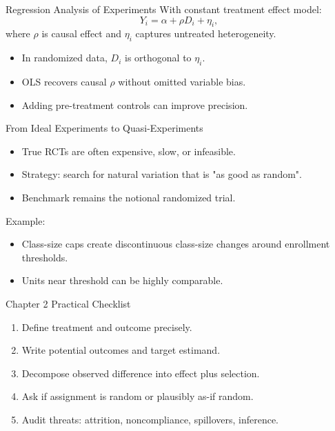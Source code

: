 \documentclass[11pt,aspectratio=169]{beamer}
\newcommand{\derivbutton}[1]{\vspace{0.4em}\hfill\hyperlink{app:#1}{\beamerbutton{Appendix details}}}
\begin{document}
\begin{frame}{Regression Analysis of Experiments}
  \hypertarget{main:reg-exp}{}
  With constant treatment effect model:
  \[
  Y_i = \alpha + \rho D_i + \eta_i,
  \]
  where \(\rho\) is causal effect and \(\eta_i\) captures untreated heterogeneity.
  \vspace{0.3em}
  \begin{itemize}
    \item In randomized data, \(D_i\) is orthogonal to \(\eta_i\).
    \item OLS recovers causal \(\rho\) without omitted variable bias.
    \item Adding pre-treatment controls can improve precision.
  \end{itemize}
  \derivbutton{reg-causal}
\end{frame}

\begin{frame}{From Ideal Experiments to Quasi-Experiments}
  \begin{itemize}
    \item True RCTs are often expensive, slow, or infeasible.
    \item Strategy: search for natural variation that is "as good as random".
    \item Benchmark remains the notional randomized trial.
  \end{itemize}
  Example:
  \begin{itemize}
    \item Class-size caps create discontinuous class-size changes around enrollment thresholds.
    \item Units near threshold can be highly comparable.
  \end{itemize}
\end{frame}

\begin{frame}{Chapter 2 Practical Checklist}
  \begin{enumerate}
    \item Define treatment and outcome precisely.
    \item Write potential outcomes and target estimand.
    \item Decompose observed difference into effect plus selection.
    \item Ask if assignment is random or plausibly as-if random.
    \item Audit threats: attrition, noncompliance, spillovers, inference.
  \end{enumerate}
\end{frame}
\end{document}
